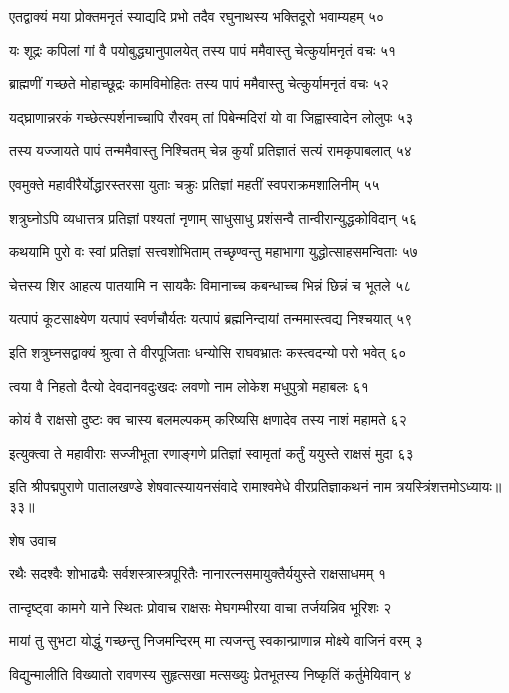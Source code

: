 एतद्वाक्यं मया प्रोक्तमनृतं स्याद्यदि प्रभो
तदैव रघुनाथस्य भक्तिदूरो भवाम्यहम् ५०

यः शूद्रः कपिलां गां वै पयोबुद्ध्यानुपालयेत्
तस्य पापं ममैवास्तु चेत्कुर्यामनृतं वचः ५१

ब्राह्मणीं गच्छते मोहाच्छूद्रः कामविमोहितः
तस्य पापं ममैवास्तु चेत्कुर्यामनृतं वचः ५२

यद्घ्राणान्नरकं गच्छेत्स्पर्शनाच्चापि रौरवम्
तां पिबेन्मदिरां यो वा जिह्वास्वादेन लोलुपः ५३

तस्य यज्जायते पापं तन्ममैवास्तु निश्चितम्
चेन्न कुर्यां प्रतिज्ञातं सत्यं रामकृपाबलात् ५४

एवमुक्ते महावीरैर्योद्धारस्तरसा युताः
चक्रुः प्रतिज्ञां महतीं स्वपराक्रमशालिनीम् ५५

शत्रुघ्नोऽपि व्यधात्तत्र प्रतिज्ञां पश्यतां नृणाम्
साधुसाधु प्रशंसन्वै तान्वीरान्युद्धकोविदान् ५६

कथयामि पुरो वः स्वां प्रतिज्ञां सत्त्वशोभिताम्
तच्छृण्वन्तु महाभागा युद्धोत्साहसमन्विताः ५७

चेत्तस्य शिर आहत्य पातयामि न सायकैः
विमानाच्च कबन्धाच्च भिन्नं छिन्नं च भूतले ५८

यत्पापं कूटसाक्ष्येण यत्पापं स्वर्णचौर्यतः
यत्पापं ब्रह्मनिन्दायां तन्ममास्त्वद्य निश्चयात् ५९

इति शत्रुघ्नसद्वाक्यं श्रुत्वा ते वीरपूजिताः
धन्योसि राघवभ्रातः कस्त्वदन्यो परो भवेत् ६०

त्वया वै निहतो दैत्यो देवदानवदुःखदः
लवणो नाम लोकेश मधुपुत्रो महाबलः ६१

कोयं वै राक्षसो दुष्टः क्व चास्य बलमल्पकम्
करिष्यसि क्षणादेव तस्य नाशं महामते ६२

इत्युक्त्वा ते महावीराः सज्जीभूता रणाङ्गणे
प्रतिज्ञां स्वामृतां कर्तुं ययुस्ते राक्षसं मुदा ६३

इति श्रीपद्मपुराणे पातालखण्डे शेषवात्स्यायनसंवादे रामाश्वमेधे वीरप्रतिज्ञाकथनं नाम त्रयस्त्रिंशत्तमोऽध्यायः॥३३॥


शेष उवाच

रथैः सदश्वैः शोभाढ्यैः सर्वशस्त्रास्त्रपूरितैः
नानारत्नसमायुक्तैर्ययुस्ते राक्षसाधमम् १

तान्दृष्ट्वा कामगे याने स्थितः प्रोवाच राक्षसः
मेघगम्भीरया वाचा तर्जयन्निव भूरिशः २

मायां तु सुभटा योद्धुं गच्छन्तु निजमन्दिरम्
मा त्यजन्तु स्वकान्प्राणान्न मोक्ष्ये वाजिनं वरम् ३

विद्युन्मालीति विख्यातो रावणस्य सुहृत्सखा
मत्सख्युः प्रेतभूतस्य निष्कृतिं कर्तुमेयिवान् ४

